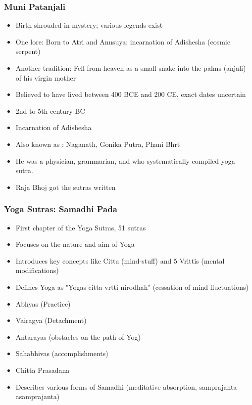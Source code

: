 \begin{frame}[fragile]\frametitle{Muni Patanjali}

    \begin{itemize}
	    \item Birth shrouded in mystery; various legends exist
    \item One lore: Born to Atri and Anusuya; incarnation of Adishesha (cosmic serpent)
    \item Another tradition: Fell from heaven as a small snake into the palms (anjali) of his virgin mother
    \item Believed to have lived between 400 BCE and 200 CE, exact dates uncertain
        \item 2nd to 5th century BC
		\item Incarnation of Adishesha
		\item Also known as : Naganath, Gonika Putra, Phani Bhrt
		\item He was a physician, grammarian, and who systematically compiled yoga sutra.
		\item Raja Bhoj got the sutras written
    \end{itemize}

\end{frame}

\begin{frame}[fragile]\frametitle{Yoga Sutras: Samadhi Pada}
    \begin{itemize}
        \item First chapter of the Yoga Sutras, 51 sutras
        \item Focuses on the nature and aim of Yoga
        \item Introduces key concepts like Citta (mind-stuff) and 5 Vrittis (mental modifications)
        \item Defines Yoga as "Yogas citta vrtti nirodhah" (cessation of mind fluctuations)
		\item Abhyas (Practice)
		\item Vairagya (Detachment)
		\item Antarayas (obstacles on the path of Yog)
		\item Sahabhivas (accomplishments)
		\item Chitta Prasadana
        \item Describes various forms of Samadhi (meditative absorption, samprajanta asamprajanta)
    \end{itemize}
\end{frame}


